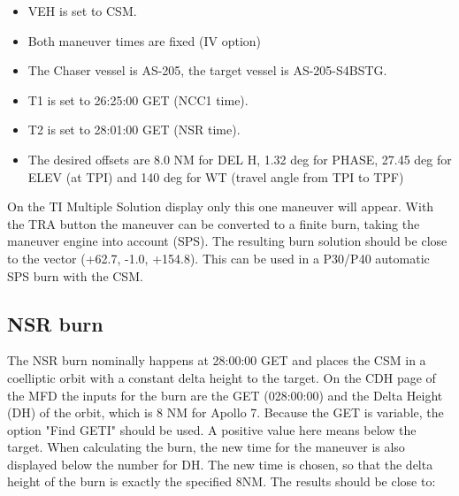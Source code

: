 \documentclass[11pt]{article} %
\begin{document}
\begin{itemize}
  \item{VEH is set to CSM.}
	\item{Both maneuver times are fixed (IV option)}
	\item{The Chaser vessel is AS-205, the target vessel is AS-205-S4BSTG.}
	\item{T1 is set to 26:25:00 GET (NCC1 time).}
	\item{T2 is set to 28:01:00 GET (NSR time).}
	\item{The desired offsets are 8.0 NM for DEL H, 1.32 deg for PHASE, 27.45 deg for ELEV (at TPI) and 140 deg for WT (travel angle from TPI to TPF)} 
\end{itemize}

On the TI Multiple Solution display only this one maneuver will appear. With the TRA button the maneuver can be converted to a finite burn, taking the maneuver engine into account (SPS). The resulting burn solution should be close to the vector (+62.7, -1.0, +154.8). This can be used in a P30/P40 automatic SPS burn with the CSM.



\subsection{NSR burn}

The NSR burn nominally happens at 28:00:00 GET and places the CSM in a coelliptic orbit with a constant delta height to the target. On the CDH page of the MFD the inputs for the burn are the GET (028:00:00) and the Delta Height (DH) of the orbit, which is 8 NM for Apollo 7. Because the GET is variable, the option "Find GETI" should be used. A positive value here means below the target. When calculating the burn, the new time for the maneuver is also displayed below the number for DH. The new time is chosen, so that the delta height of the burn is exactly the specified 8NM. The results should be close to:
\end{document}
